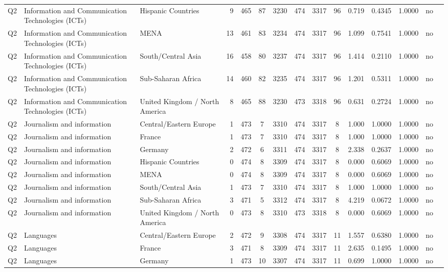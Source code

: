\begin{longtable}{lllrcccccccccll}
Q2 & Information and Communication Technologies (ICTs) & Hispanic Countries & 9 & 465 & 87 & 3230 & 474 & 3317 & 96 & 0.719 & 0.4345 & 1.0000 & no \\
Q2 & Information and Communication Technologies (ICTs) & MENA & 13 & 461 & 83 & 3234 & 474 & 3317 & 96 & 1.099 & 0.7541 & 1.0000 & no \\
Q2 & Information and Communication Technologies (ICTs) & South/Central Asia & 16 & 458 & 80 & 3237 & 474 & 3317 & 96 & 1.414 & 0.2110 & 1.0000 & no \\
Q2 & Information and Communication Technologies (ICTs) & Sub-Saharan Africa & 14 & 460 & 82 & 3235 & 474 & 3317 & 96 & 1.201 & 0.5311 & 1.0000 & no \\
Q2 & Information and Communication Technologies (ICTs) & United Kingdom / North America & 8 & 465 & 88 & 3230 & 473 & 3318 & 96 & 0.631 & 0.2724 & 1.0000 & no \\
Q2 & Journalism and information & Central/Eastern Europe & 1 & 473 & 7 & 3310 & 474 & 3317 & 8 & 1.000 & 1.0000 & 1.0000 & no \\
Q2 & Journalism and information & France & 1 & 473 & 7 & 3310 & 474 & 3317 & 8 & 1.000 & 1.0000 & 1.0000 & no \\
Q2 & Journalism and information & Germany & 2 & 472 & 6 & 3311 & 474 & 3317 & 8 & 2.338 & 0.2637 & 1.0000 & no \\
Q2 & Journalism and information & Hispanic Countries & 0 & 474 & 8 & 3309 & 474 & 3317 & 8 & 0.000 & 0.6069 & 1.0000 & no \\
Q2 & Journalism and information & MENA & 0 & 474 & 8 & 3309 & 474 & 3317 & 8 & 0.000 & 0.6069 & 1.0000 & no \\
Q2 & Journalism and information & South/Central Asia & 1 & 473 & 7 & 3310 & 474 & 3317 & 8 & 1.000 & 1.0000 & 1.0000 & no \\
Q2 & Journalism and information & Sub-Saharan Africa & 3 & 471 & 5 & 3312 & 474 & 3317 & 8 & 4.219 & 0.0672 & 1.0000 & no \\
Q2 & Journalism and information & United Kingdom / North America & 0 & 473 & 8 & 3310 & 473 & 3318 & 8 & 0.000 & 0.6069 & 1.0000 & no \\
Q2 & Languages & Central/Eastern Europe & 2 & 472 & 9 & 3308 & 474 & 3317 & 11 & 1.557 & 0.6380 & 1.0000 & no \\
Q2 & Languages & France & 3 & 471 & 8 & 3309 & 474 & 3317 & 11 & 2.635 & 0.1495 & 1.0000 & no \\
Q2 & Languages & Germany & 1 & 473 & 10 & 3307 & 474 & 3317 & 11 & 0.699 & 1.0000 & 1.0000 & no \\

\end{longtable}
